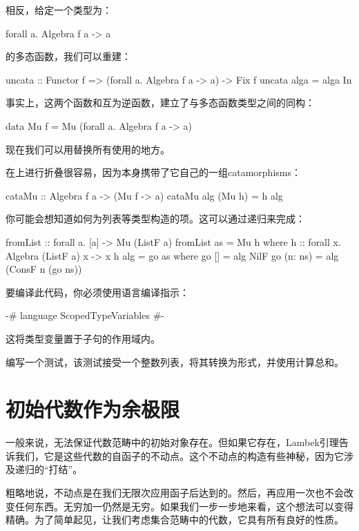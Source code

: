 \documentclass[DaoFP]{subfiles}
\begin{document}
相反，给定一个类型为：
\begin{haskell}
forall a. Algebra f a -> a
\end{haskell}
的多态函数，我们可以重建：
\begin{haskell}
uncata :: Functor f => (forall a. Algebra f a -> a) -> Fix f
uncata alga = alga In
\end{haskell}
事实上，这两个函数和互为逆函数，建立了与多态函数类型之间的同构：
\begin{haskell}
data Mu f = Mu (forall a. Algebra f a -> a)
\end{haskell}
现在我们可以用替换所有使用的地方。

在上进行折叠很容易，因为本身携带了它自己的一组catamorphisms：
\begin{haskell}
cataMu :: Algebra f a -> (Mu f -> a)
cataMu alg (Mu h) = h alg
\end{haskell}

你可能会想知道如何为列表等类型构造的项。这可以通过递归来完成：
\begin{haskell}
fromList :: forall a. [a] -> Mu (ListF a)
fromList as = Mu h
  where h :: forall x. Algebra (ListF a) x -> x
        h alg = go as
          where
            go [] = alg NilF
            go (n: ns) = alg (ConsF n (go ns))
\end{haskell}
要编译此代码，你必须使用语言编译指示：
\begin{haskell}
{-# language ScopedTypeVariables #-}
\end{haskell}
这将类型变量置于子句的作用域内。

\begin{exercise}
编写一个测试，该测试接受一个整数列表，将其转换为形式，并使用计算总和。
\end{exercise}

\section{初始代数作为余极限}

一般来说，无法保证代数范畴中的初始对象存在。但如果它存在，Lambek引理告诉我们，它是这些代数的自函子的不动点。这个不动点的构造有些神秘，因为它涉及递归的“打结”。

粗略地说，不动点是在我们无限次应用函子后达到的。然后，再应用一次也不会改变任何东西。无穷加一仍然是无穷。如果我们一步一步地来看，这个想法可以变得精确。为了简单起见，让我们考虑集合范畴中的代数，它具有所有良好的性质。
\end{document}
